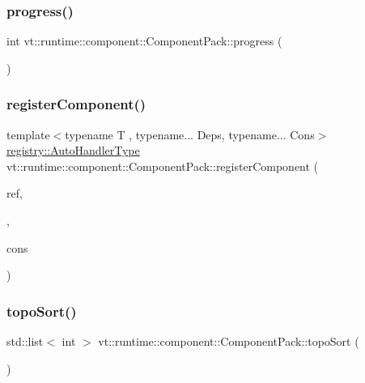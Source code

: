 \subsubsection{\texorpdfstring{progress()}{progress()}}
{\footnotesize\ttfamily int vt\+::runtime\+::component\+::\+Component\+Pack\+::progress (\begin{DoxyParamCaption}{ }\end{DoxyParamCaption})}

\mbox{\label{structvt_1_1runtime_1_1component_1_1_component_pack_a956437fba91b2b90576df33276858df5}} 
\subsubsection{\texorpdfstring{register\+Component()}{registerComponent()}}
{\footnotesize\ttfamily template$<$typename T , typename... Deps, typename... Cons$>$ \\
\hyperlink{namespacevt_1_1runtime_1_1component_1_1registry_a9b86518797c7bb91babf0ca8ee7d06e6}{registry\+::\+Auto\+Handler\+Type} vt\+::runtime\+::component\+::\+Component\+Pack\+::register\+Component (\begin{DoxyParamCaption}\item[{T $\ast$$\ast$}]{ref,  }\item[{typename \hyperlink{structvt_1_1runtime_1_1component_1_1_base_component_1_1_deps_pack}{Base\+Component\+::\+Deps\+Pack}$<$ Deps... $>$}]{,  }\item[{Cons \&\&...}]{cons }\end{DoxyParamCaption})}

\mbox{\label{structvt_1_1runtime_1_1component_1_1_component_pack_a5ca923fe22474d1c26a97d6d5dbfc0a3}} 
\subsubsection{\texorpdfstring{topo\+Sort()}{topoSort()}}
{\footnotesize\ttfamily std\+::list$<$ int $>$ vt\+::runtime\+::component\+::\+Component\+Pack\+::topo\+Sort (\begin{DoxyParamCaption}{ }\end{DoxyParamCaption})\hspace{0.3cm}{\ttfamily [private]}}

